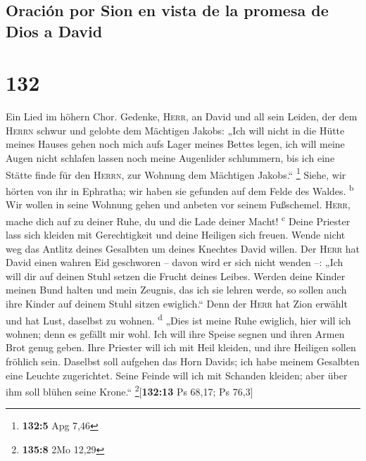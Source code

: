\hypertarget{oraciuxf3n-por-sion-en-vista-de-la-promesa-de-dios-a-david}{%
\subsection{Oración por Sion en vista de la promesa de Dios a
David}\label{oraciuxf3n-por-sion-en-vista-de-la-promesa-de-dios-a-david}}

\hypertarget{section-131}{%
\section{132}\label{section-131}}

 Ein Lied im höhern Chor. Gedenke, \textsc{Herr}, an David
und all sein Leiden,  der dem \textsc{Herrn} schwur und
gelobte dem Mächtigen Jakobs:  „Ich will nicht in die
Hütte meines Hauses gehen noch mich aufs Lager meines Bettes legen,
 ich will meine Augen nicht schlafen lassen noch meine
Augenlider schlummern,  bis ich eine Stätte finde für den
\textsc{Herrn}, zur Wohnung dem Mächtigen Jakobs.`` \footnote{\textbf{132:5}
  Apg 7,46}  Siehe, wir hörten von ihr in Ephratha; wir
haben sie gefunden auf dem Felde des Waldes. \textsuperscript{b}
 Wir wollen in seine Wohnung gehen und anbeten vor seinem
Fußschemel.  \textsc{Herr}, mache dich auf zu deiner Ruhe,
du und die Lade deiner Macht! \textsuperscript{c}  Deine
Priester lass sich kleiden mit Gerechtigkeit und deine Heiligen sich
freuen.  Wende nicht weg das Antlitz deines Gesalbten um
deines Knechtes David willen.  Der \textsc{Herr} hat
David einen wahren Eid geschworen -- davon wird er sich nicht wenden --:
„Ich will dir auf deinen Stuhl setzen die Frucht deines Leibes.
 Werden deine Kinder meinen Bund halten und mein Zeugnis,
das ich sie lehren werde, so sollen auch ihre Kinder auf deinem Stuhl
sitzen ewiglich.``  Denn der \textsc{Herr} hat Zion
erwählt und hat Lust, daselbst zu wohnen. \textsuperscript{d}
 „Dies ist meine Ruhe ewiglich, hier will ich wohnen;
denn es gefällt mir wohl.  Ich will ihre Speise segnen
und ihren Armen Brot genug geben.  Ihre Priester will ich
mit Heil kleiden, und ihre Heiligen sollen fröhlich sein.
 Daselbst soll aufgehen das Horn Davids; ich habe meinem
Gesalbten eine Leuchte zugerichtet.  Seine Feinde will
ich mit Schanden kleiden; aber über ihm soll blühen seine Krone.``
\footnote{\textbf{135:8} 2Mo 12,29}{[}\textbf{132:13} Ps 68,17; Ps
76,3{]}

